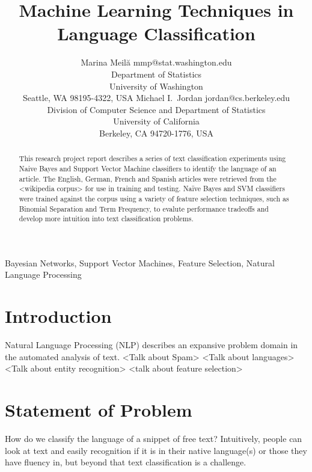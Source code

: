 \documentclass[twoside,11pt]{article}
\begin{document}
\title{Machine Learning Techniques in Language Classification}

\author{\name Marina Meil\u{a} \email mmp@stat.washington.edu \\
       \addr Department of Statistics\\
       University of Washington\\
       Seattle, WA 98195-4322, USA
       \AND
       \name Michael I.\ Jordan \email jordan@cs.berkeley.edu \\
       \addr Division of Computer Science and Department of Statistics\\
       University of California\\
       Berkeley, CA 94720-1776, USA}


\maketitle

\begin{abstract}%
This research project report describes a series of text classification experiments using Naive Bayes and Support Vector Machine classifiers to identify the language of an article.  The English, German, French and Spanish articles were retrieved from the <wikipedia corpus> for use in training and testing. Na\"ive Bayes and SVM classifiers were trained against the corpus using a variety of feature selection techniques, such as Binomial Separation and Term Frequency, to evalute performance tradeoffs and develop more intuition into text classification problems.
\end{abstract}

\begin{keywords}
  Bayesian Networks, Support Vector Machines, Feature Selection, Natural Language Processing
\end{keywords}

\section{Introduction}
Natural Language Processing (NLP) describes an expansive problem domain in the automated analysis of text.
<Talk about Spam>
<Talk about languages>
<Talk about entity recognition>
<talk about feature selection>


\section{Statement of Problem}
How do we classify the language of a snippet of free text?  Intuitively, people can look at text and easily recognition if it is in their native language(s) or those they have fluency in, but beyond that text classification is a challenge.
\end{document}
